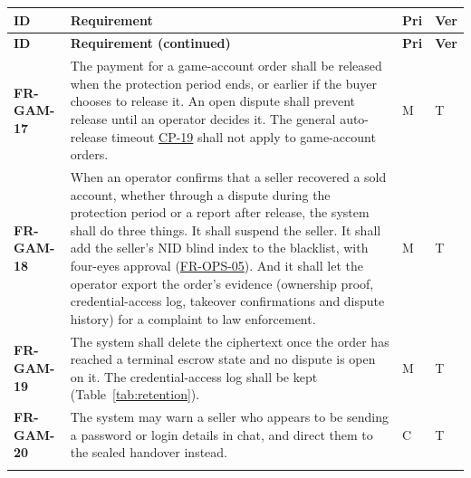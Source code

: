 \documentclass[11pt,a4paper]{report}
\makeatletter
\newenvironment{reqs}{%
  \small
  \begin{longtable}{@{}>{\raggedright\arraybackslash}p{2.35cm}
                       >{\raggedright\arraybackslash}p{10.3cm}
                       >{\centering\arraybackslash}p{0.7cm}
                       >{\centering\arraybackslash}p{0.7cm}@{}}
  \toprule
  \textbf{ID} & \textbf{Requirement} & \textbf{Pri} & \textbf{Ver} \\
  \midrule
  \endfirsthead
  \toprule
  \textbf{ID} & \textbf{Requirement (continued)} & \textbf{Pri} & \textbf{Ver} \\
  \midrule
  \endhead
  \bottomrule
  \endfoot
}{\end{longtable}}
\newcommand{\req}[5]{\leavevmode\textbf{#1}\hypertarget{#1}{} & #5 & #2 & #3 \\ \addlinespace[2pt]}
\newcommand{\rr}[1]{\hyperlink{#1}{#1}}
\newcommand{\cp}[1]{\hyperlink{#1}{#1}}
\makeatother
\begin{document}
\begin{reqs}
\req{FR-GAM-17}{M}{T}{FR-102}{The payment for a game-account order shall be released when the protection period ends, or earlier if the buyer chooses to release it. An open dispute shall prevent release until an operator decides it. The general auto-release timeout \cp{CP-19} shall not apply to game-account orders.}
\req{FR-GAM-18}{M}{T}{FR-103}{When an operator confirms that a seller recovered a sold account, whether through a dispute during the protection period or a report after release, the system shall do three things. It shall suspend the seller. It shall add the seller's NID blind index to the blacklist, with four-eyes approval (\rr{FR-OPS-05}). And it shall let the operator export the order's evidence (ownership proof, credential-access log, takeover confirmations and dispute history) for a complaint to law enforcement.}
\req{FR-GAM-19}{M}{T}{new}{The system shall delete the ciphertext once the order has reached a terminal escrow state and no dispute is open on it. The credential-access log shall be kept (Table~\ref{tab:retention}).}
\req{FR-GAM-20}{C}{T}{new}{The system may warn a seller who appears to be sending a password or login details in chat, and direct them to the sealed handover instead.}
\end{reqs}
\end{document}
